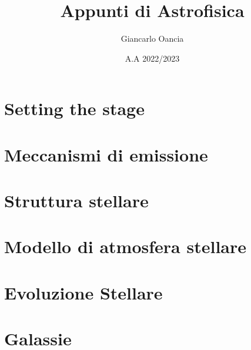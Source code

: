 \documentclass[]{book}
\begin{document}
\frontmatter
\author{Giancarlo Oancia}
\title{Appunti di Astrofisica}
\date{A.A 2022/2023} %
\tableofcontents

\mainmatter
\chapter{Setting the stage}



\chapter{Meccanismi di emissione}







\chapter{Struttura stellare}









\chapter{Modello di atmosfera stellare}




\chapter{Evoluzione Stellare}





\chapter{Galassie}




\end{document}
